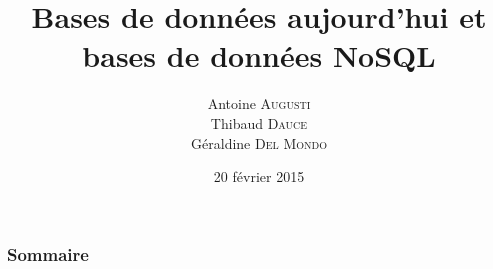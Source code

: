 \documentclass[handout]{beamer}
\title{
	Bases de données aujourd'hui et bases de données NoSQL
}
\author{
	Antoine \textsc{Augusti}\\
	\vspace{5px}
	Thibaud \textsc{Dauce} \\
	\vspace{5px}
	Géraldine \textsc{Del Mondo} \\
}
\date{20 février 2015}
\begin{document}
	\begin{frame}[plain]
		\titlepage
	\end{frame}

	\begin{frame}[plain]
		\frametitle{Sommaire}
		\tableofcontents
	\end{frame}

		

		

		

		
\end{document}
